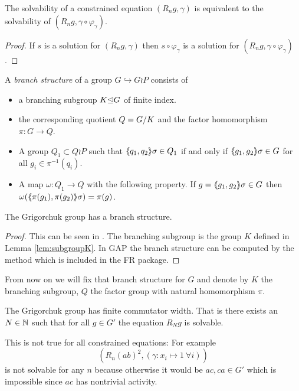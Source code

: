 \documentclass[a4paper,11pt]{amsart}
\begin{document}
\begin{lem} \label{lem:solvabilityWithReducedConstraint}
 The solvability of a constrained equation $(R_n g,\gamma)$ is equivalent to the solvability of $(R_n g,\gamma\circ \varphi_\gamma)$.
\end{lem}
 \begin{proof}
 If $s$ is a solution for $(R_n g,\gamma)$ then $s\circ \varphi_\gamma$ is
 a solution for $(R_n g,\gamma\circ \varphi_\gamma)$. 
\end{proof}


\begin{defi} 
A \emph{branch structure} of a group $G\hookrightarrow G \wr P$ consists of  
\begin{itemize}
 \item a branching subgroup $K{\mathrel\trianglelefteq} G$ of finite index. 
 \item the corresponding quotient $Q={G/K}$ and the factor homomorphism $\pi\colon G \to Q$.
 \item A group $Q_1 \subset Q \wr P$ such that $\langle\negthickspace\langle q_1,q_2\rangle\negthickspace\rangle\sigma\in Q_1$ if and only if $\langle\negthickspace\langle g_1,g_2\rangle\negthickspace\rangle\sigma \in G$ for all $g_i \in \pi^{-1}(q_i)$.
 \item A map $\omega\colon Q_1 \to Q$ with the following property. If $g=\langle\negthickspace\langle g_1,g_2\rangle\negthickspace\rangle\sigma \in G$ then $\omega(\langle\negthickspace\langle\pi(g_1),\pi(g_2)\rangle\negthickspace\rangle\sigma) = \pi(g)$.
\end{itemize}
\end{defi}
\begin{lem}
 The Grigorchuk group has a branch structure.
\end{lem}
\begin{proof}
 This can be seen in \cite{Bartholdi:RepresentationZetaFunctions}.
 The branching subgroup is the group $K$ defined in Lemma \ref{lem:subgroupK}. In GAP the branch structure can be computed
 by the method  which is included in the FR package. 
\end{proof}
From now on we will fix that branch structure for $G$ and denote by $K$ the branching subgroup, $Q$ the factor group with natural homomorphism $\pi$.

\begin{thm}\label{IgorsThm}
 The Grigorchuk group has finite commutator width. That is
 there exists an $N\in\mathbb{N}$ such that for all $g\in G'$ the equation $R_Ng$ is solvable.
\end{thm}
\begin{re}
 This is not true for all constrained equations: For example
 \[\left(R_n(ab)^2,(\gamma\colon x_i\mapsto 1\ \forall i)\right)\] 
 is not solvable for any $n$ because otherwise it would be $ac,ca\in G'$ 
 which is impossible since $ac$ has nontrivial activity.
\end{re}
\end{document}

